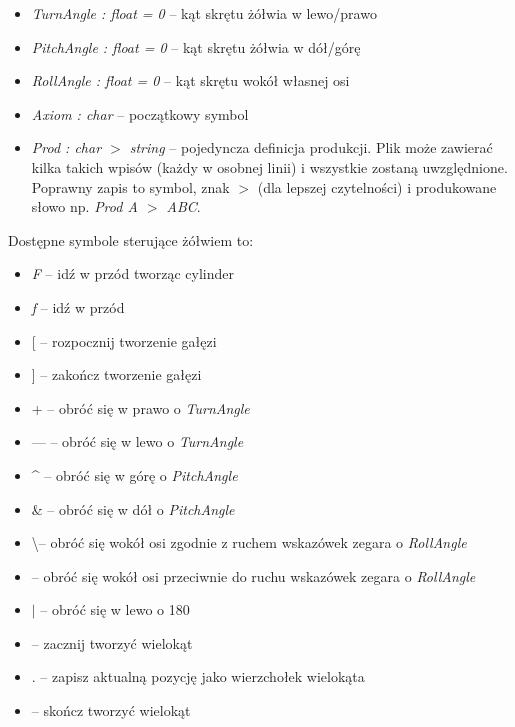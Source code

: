 \documentclass[inz,longabstract]{iithesis}
\begin{document}
        \begin{itemize}
            \item \textit{TurnAngle : float = 0} -- kąt skrętu żółwia w lewo/prawo
            \item \textit{PitchAngle : float = 0} -- kąt skrętu żółwia w dół/górę 
            \item \textit{RollAngle : float = 0} -- kąt skrętu wokół własnej osi
            \item \textit{Axiom : char} -- początkowy symbol
            \item \textit{Prod : char $>$ string } -- pojedyncza definicja produkcji. Plik może zawierać kilka takich wpisów (każdy w osobnej linii) i wszystkie zostaną uwzględnione. Poprawny zapis to symbol, znak $>$ (dla lepszej czytelności) i produkowane słowo np. \textit{Prod A $>$ ABC}. 
        \end{itemize}
        
        Dostępne symbole sterujące żółwiem to:
        \begin{itemize}
            \item \textit{F} -- idź w przód tworząc cylinder
            \item \textit{f} -- idź w przód
            \item {[} -- rozpocznij tworzenie gałęzi
            \item {]} -- zakończ tworzenie gałęzi
            \item + -- obróć się w prawo o \textit{TurnAngle}
            \item --- -- obróć się w lewo o \textit{TurnAngle}
            \item \^{} -- obróć się w górę o \textit{PitchAngle}
            \item \& -- obróć się w dół o \textit{PitchAngle}
            \item \textbackslash -- obróć się wokół osi zgodnie z ruchem wskazówek zegara o \textit{RollAngle}
            \item \text{/} -- obróć się wokół osi przeciwnie do ruchu wskazówek zegara o \textit{RollAngle}
            \item $|$ -- obróć się w lewo o 180\degree
            \item \textbraceleft -- zacznij tworzyć wielokąt
            \item . -- zapisz aktualną pozycję jako wierzchołek wielokąta
            \item \textbraceright -- skończ tworzyć wielokąt
        \end{itemize}
        
\end{document}
